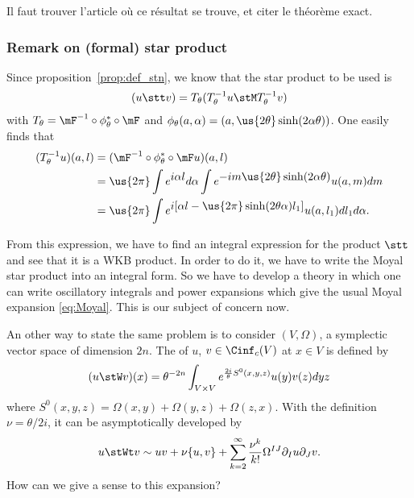 \begin{probleme}
Il faut trouver l'article où ce résultat se trouve, et citer le théorème exact.
\label{ProbEnonSLdef}
\end{probleme}

\subsubsection{Remark on (formal) star product}\label{subsec:rem_on_sp}

Since proposition~\ref{prop:def_stn}, we know that the star product to be used is
\[
    (u\stt v)=T_{\theta}(T_{\theta}^{-1} u\stM T_{\theta}^{-1} v)
\]
with $T_{\theta}=\mF^{-1}\circ\phi^*_{\theta}\circ\mF$ and $\phi_{\theta}(a,\alpha)=(a,\us{2\theta}\sinh(2\alpha\theta))$. One easily finds that
\begin{equation}
\begin{split}
   (T^{-1}_{\theta} u)(a,l)&=(\mF^{-1}\circ\phi^*_{\theta}\circ\mF u)(a,l)\\
                        &=\us{2\pi}\int e^{\displaystyle i\alpha l}d\alpha\int
                          e^{\displaystyle-im\us{2\theta}\sinh(2\alpha\theta)}u(a,m)dm\\
			&=\us{2\pi}\int
			  e^{\displaystyle i[\alpha l-\us{2\pi}\sinh(2\theta\alpha)l_1] }
			  u(a,l_1)dl_1d\alpha.
\end{split}
\end{equation}

From this expression, we have to find an integral expression for the product $\stt$ and see that it is a WKB product. In order to do it, we have to write the Moyal star product into an integral form. So we have to develop a theory in which one can write oscillatory integrals and power expansions which give the usual Moyal expansion \eqref{eq:Moyal}. This is our subject of concern now.

An other way to state the same problem is to consider $(V,\Omega)$, a symplectic vector space of dimension $2n$. The  of $u$, $v\in\Cinf_c(V)$ at $x\in V$ is defined by
\[
  (u\stW v)(x)=\theta^{-2n}\int_{V\times V}e^{\frac{2i}{\theta}S^0(x,y,z)}u(y)v(z)dyz
\]
where $S^0(x,y,z)=\Omega(x,y)+\Omega(y,z)+\Omega(z,x)$. With the
 definition  $\nu=\theta/2i$, it can be asymptotically developed by
\[
  u\stWt v\sim uv+\nu\{u,v\}+\sum_{k=2}^{\infty}\frac{\nu^k}{k!}\Omega^{IJ}\partial_Iu\partial_Jv.
\]
How can we give a sense to this expansion?

